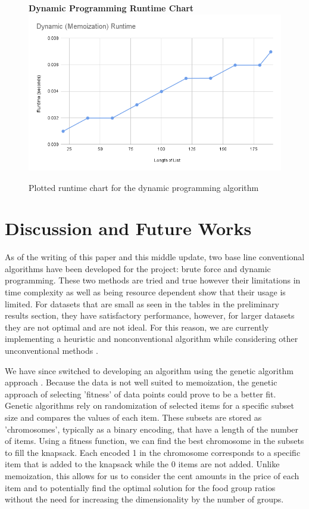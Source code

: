 \documentclass[10pt,journal,compsoc]{IEEEtran}
\begin{document}
\begin{figure}[h]
    \centering
    \textbf{Dynamic Programming Runtime Chart}
    \includegraphics[width=\columnwidth]{assets/dynamic_runtime.png}
    \caption{Plotted runtime chart for the dynamic programming algorithm}
    \label{fig:dynamic_timecomplexity.png}
\end{figure}

\section{Discussion and Future Works}
As of the writing of this paper and this middle update, two base line
conventional algorithms have been developed for the project: brute force and
dynamic programming. These two methods are tried and true however their
limitations in time complexity as well as being resource dependent show that
their usage is limited. For datasets that are small as seen in the tables in the
preliminary results section, they have satisfactory performance, however, for
larger datasets they are not optimal and are not ideal. For this reason, we are
currently implementing a heuristic and nonconventional algorithm while
considering other unconventional methods\cite{nomer_neural_2020} \cite{mansi_hybrid_2013}.

We have since switched to developing an algorithm using the genetic algorithm
approach \cite{djannaty_hybrid_2008}. Because the data is not well suited to
memoization, the genetic approach of selecting 'fitness' of data points could
prove to be a better fit. Genetic algorithms rely on randomization of selected
items for a specific subset size and compares the values of each item. These
subsets are stored as 'chromosomes', typically as a binary encoding, that have a
length of the number of items. Using a fitness function, we can find the best
chromosome in the subsets to fill the knapsack. Each encoded 1 in the chromosome
corresponds to a specific item that is added to the knapsack while the 0 items
are not added. Unlike memoization, this allows for us to consider the cent
amounts in the price of each item and to potentially find the optimal solution
for the food group ratios without the need for increasing the dimensionality by
the number of groups.
\end{document}

